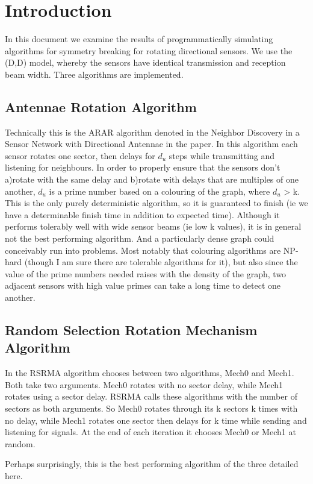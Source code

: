 \section{Introduction}
In this document we examine the results of programmatically simulating algorithms for symmetry breaking for rotating directional sensors. We use the (D,D) model, whereby the sensors have identical transmission and reception beam width. Three algorithms are implemented.

\subsection{Antennae Rotation Algorithm}
Technically this is the ARAR algorithm denoted in the Neighbor Discovery in a Sensor Network with Directional Antennae in the paper.
In this algorithm each sensor rotates one sector, then delays for $d_{u}$ steps while transmitting and listening for neighbours. In order to properly ensure that the sensors don't a)rotate with the same delay and b)rotate with delays that are multiples of one another, $d_{u}$ is a prime number based on a colouring of the graph, where  $d_{u}$ > k. This is the only purely deterministic algorithm, so it is guaranteed to finish (ie we have a determinable finish time in addition to expected time). Although it performs tolerably well with wide sensor beams (ie low k values), it is in general not the best performing algorithm. And a particularly dense graph could conceivably run into problems. Most notably that colouring algorithms are NP-hard (though I am sure there are tolerable algorithms for it), but also since the value of the prime numbers needed raises with the density of the graph, two adjacent sensors with high value primes can take a long time to detect one another. 

\subsection{Random Selection Rotation Mechanism Algorithm}
In the RSRMA algorithm chooses between two algorithms, Mech0 and Mech1. Both take two arguments. Mech0 rotates with no sector delay, while Mech1 rotates using a sector delay. RSRMA calls these algorithms with the number of sectors as both arguments. So Mech0 rotates through its k sectors k times with no delay, while Mech1 rotates one sector then delays for k time while sending and listening for signals. At the end of each iteration it chooses Mech0 or Mech1 at random.

Perhaps surprisingly, this is the best performing algorithm of the three detailed here. 

